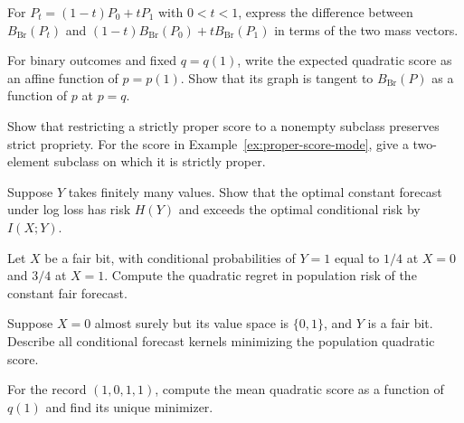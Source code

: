 \documentclass[11pt,oneside]{book}
\theoremstyle{definition}
\theoremstyle{remark}
\begin{document}
\begin{practiceexercise}
\label{pex:quadratic-score-concavity-gap}
For $P_t=(1-t)P_0+tP_1$ with $0<t<1$, express the difference
between $B_{\mathrm{Br}}(P_t)$ and
$(1-t)B_{\mathrm{Br}}(P_0)+tB_{\mathrm{Br}}(P_1)$ in terms of
the two mass vectors.
\end{practiceexercise}

\begin{practiceexercise}
\label{pex:quadratic-score-affine-support}
For binary outcomes and fixed $q=q(1)$, write the expected
quadratic score as an affine function of $p=p(1)$. Show that
its graph is tangent to $B_{\mathrm{Br}}(P)$ as a function of $p$
at $p=q$.
\end{practiceexercise}

\begin{practiceexercise}
\label{pex:proper-score-restrict-domain}
Show that restricting a strictly proper score to a nonempty
subclass preserves strict propriety. For the score in
Example~\ref{ex:proper-score-mode}, give a two-element subclass
on which it is strictly proper.
\end{practiceexercise}

\begin{practiceexercise}
\label{pex:proper-score-constant-log-penalty}
Suppose $Y$ takes finitely many values. Show that the optimal
constant forecast under log loss has risk $H(Y)$ and exceeds
the optimal conditional risk by $I(X;Y)$.
\end{practiceexercise}

\begin{practiceexercise}
\label{pex:proper-score-conditional-regret}
Let $X$ be a fair bit, with conditional probabilities of $Y=1$
equal to $1/4$ at $X=0$ and $3/4$ at $X=1$. Compute the
quadratic regret in population risk of the constant fair forecast.
\end{practiceexercise}

\begin{practiceexercise}
\label{pex:proper-score-null-feature}
Suppose $X=0$ almost surely but its value space is $\{0,1\}$, and
$Y$ is a fair bit. Describe all conditional forecast kernels
minimizing the population quadratic score.
\end{practiceexercise}

\begin{practiceexercise}
\label{pex:proper-score-fit-binary-record}
For the record $(1,0,1,1)$, compute the mean quadratic score
as a function of $q(1)$ and find its unique minimizer.
\end{practiceexercise}
\end{document}
